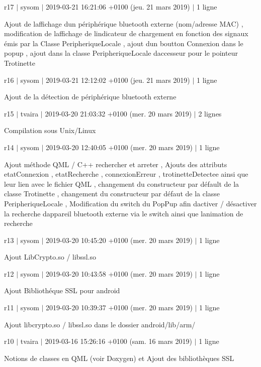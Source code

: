 r17 $\vert$ sysom $\vert$ 2019-\/03-\/21 16\+:21\+:06 +0100 (jeu. 21 mars 2019) $\vert$ 1 ligne

Ajout de l\textquotesingle{}affichage d\textquotesingle{}un périphérique bluetooth externe (nom/adresse M\+AC) , modification de l\textquotesingle{}affichage de l\textquotesingle{}indicateur de chargement en fonction des signaux émis par la Classe Peripherique\+Locale , ajout d\textquotesingle{}un boutton Connexion dans le popup , ajout dans la classe Peripherique\+Locale d\textquotesingle{}accesseur pour le pointeur Trotinette

r16 $\vert$ sysom $\vert$ 2019-\/03-\/21 12\+:12\+:02 +0100 (jeu. 21 mars 2019) $\vert$ 1 ligne

Ajout de la détection de périphérique bluetooth externe

r15 $\vert$ tvaira $\vert$ 2019-\/03-\/20 21\+:03\+:32 +0100 (mer. 20 mars 2019) $\vert$ 2 lignes

Compilation sous Unix/\+Linux

r14 $\vert$ sysom $\vert$ 2019-\/03-\/20 12\+:40\+:05 +0100 (mer. 20 mars 2019) $\vert$ 1 ligne

Ajout méthode Q\+ML / C++ rechercher et arreter , Ajouts des attributs etat\+Connexion , etat\+Recherche , connexion\+Erreur , trotinette\+Detectee ainsi que leur lien avec le fichier Q\+ML , changement du constructeur par défault de la classe Trotinette , changement du constructeur par défaut de la classe Peripherique\+Locale , Modification du switch du Pop\+Pup afin d\textquotesingle{}activer / désactiver la recherche d\textquotesingle{}appareil bluetooth externe via le switch ainsi que l\textquotesingle{}animation de recherche

r13 $\vert$ sysom $\vert$ 2019-\/03-\/20 10\+:45\+:20 +0100 (mer. 20 mars 2019) $\vert$ 1 ligne

Ajout Lib\+Crypto.\+so / libssl.\+so

r12 $\vert$ sysom $\vert$ 2019-\/03-\/20 10\+:43\+:58 +0100 (mer. 20 mars 2019) $\vert$ 1 ligne

Ajout Bibliothéque S\+SL pour android

r11 $\vert$ sysom $\vert$ 2019-\/03-\/20 10\+:39\+:37 +0100 (mer. 20 mars 2019) $\vert$ 1 ligne

Ajout libcrypto.\+so / libssl.\+so dans le dossier android/lib/arm/

r10 $\vert$ tvaira $\vert$ 2019-\/03-\/16 15\+:26\+:16 +0100 (sam. 16 mars 2019) $\vert$ 1 ligne

Notions de classes en Q\+ML (voir Doxygen) et Ajout des bibliothèques S\+SL

